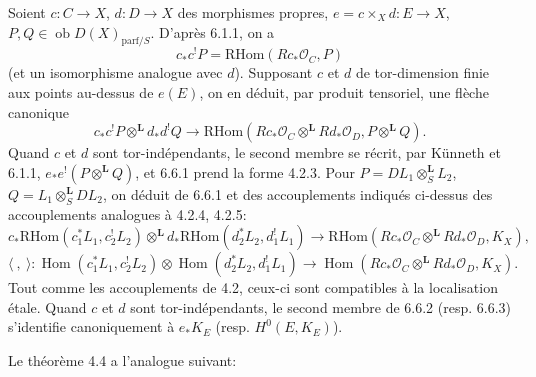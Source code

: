 \documentclass[11pt]{article}
\providecommand{\cO}{\mathcal{O}}
\DeclareMathOperator{\Hom}{Hom}
\providecommand{\RHom}{\mathrm{RHom}}
\providecommand{\RHom}{\mathrm{RHom}}
\providecommand{\Hom}{\operatorname{Hom}}
\providecommand{\RHom}{\mathrm R\mathcal{H}om}
\providecommand{\RHom}{\mathrm{RHom}}
\providecommand{\Hom}{\operatorname{Hom}}
\begin{document}
Soient $c:C\to X$, $d:D\to X$ des morphismes propres, $e=c\times_Xd:E\to X$, $P,Q\in\operatorname{ob}D(X)_{\mathrm{parf}/S}$. D'après 6.1.1, on a
\[
c_*c^!P=\RHom(Rc_*\cO_C,P)
\]
(et un isomorphisme analogue avec $d$). Supposant $c$ et $d$ de tor-dimension finie aux points au-dessus de $e(E)$, on en déduit, par produit tensoriel, une flèche canonique
\begin{equation}
\tag{6.6.1}
c_*c^!P\otimes^{\mathbf L}d_*d^!Q\longrightarrow
\RHom(Rc_*\cO_C\otimes^{\mathbf L}Rd_*\cO_D,P\otimes^{\mathbf L}Q).
\end{equation}
Quand $c$ et $d$ sont tor-indépendants, le second membre se récrit, par Künneth et 6.1.1, $e_*e^!(P\otimes^{\mathbf L}Q)$, et 6.6.1 prend la forme 4.2.3. Pour $P=DL_1\otimes_S^{\mathbf L}L_2$, $Q=L_1\otimes_S^{\mathbf L}DL_2$, on déduit de 6.6.1 et des accouplements indiqués ci-dessus des accouplements analogues à 4.2.4, 4.2.5:
\begin{equation}
\tag{6.6.2}
c_*\RHom(c_1^*L_1,c_2^!L_2)\otimes^{\mathbf L}d_*\RHom(d_2^*L_2,d_1^!L_1)
\longrightarrow\RHom(Rc_*\cO_C\otimes^{\mathbf L}Rd_*\cO_D,K_X),
\end{equation}
\begin{equation}
\tag{6.6.3}
\langle\ ,\ \rangle:\Hom(c_1^*L_1,c_2^!L_2)\otimes\Hom(d_2^*L_2,d_1^!L_1)
\longrightarrow\Hom(Rc_*\cO_C\otimes^{\mathbf L}Rd_*\cO_D,K_X).
\end{equation}
Tout comme les accouplements de 4.2, ceux-ci sont compatibles à la localisation étale. Quand $c$ et $d$ sont tor-indépendants, le second membre de 6.6.2 (resp. 6.6.3) s'identifie canoniquement à $e_*K_E$ (resp. $H^0(E,K_E)$).

Le théorème 4.4 a l'analogue suivant:
\end{document}
